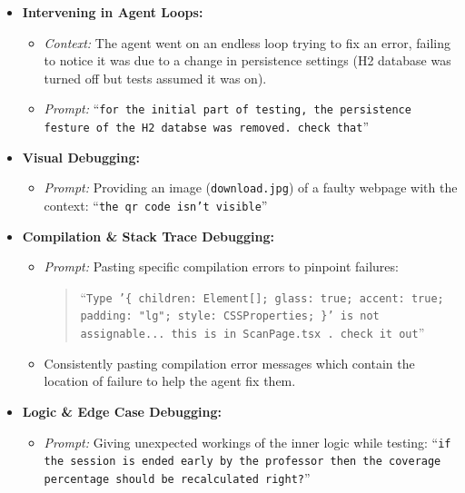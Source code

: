 \documentclass[11pt,a4paper]{article}
\begin{document}
\begin{itemize}[leftmargin=*, itemsep=6pt]
    \item \textbf{Intervening in Agent Loops:}
    \begin{itemize}[itemsep=4pt]
        \item \textit{Context:} The agent went on an endless loop trying to fix an error, failing to notice it was due to a change in persistence settings (H2 database was turned off but tests assumed it was on).
        \item \textit{Prompt:} ``\texttt{for the initial part of testing, the persistence festure of the H2 databse was removed. check that}''
    \end{itemize}

    \item \textbf{Visual Debugging:}
    \begin{itemize}[itemsep=4pt]
        \item \textit{Prompt:} Providing an image (\texttt{download.jpg}) of a faulty webpage with the context: ``\texttt{the qr code isn't visible}''
    \end{itemize}

    \item \textbf{Compilation \& Stack Trace Debugging:}
    \begin{itemize}[itemsep=4pt]
        \item \textit{Prompt:} Pasting specific compilation errors to pinpoint failures:
        \begin{quote}
        ``\texttt{Type '\{ children: Element[]; glass: true; accent: true; padding: "lg"; style: CSSProperties; \}' is not assignable... this is in ScanPage.tsx . check it out}''
        \end{quote}
        \item Consistently pasting compilation error messages which contain the location of failure to help the agent fix them.
    \end{itemize}

    \item \textbf{Logic \& Edge Case Debugging:}
    \begin{itemize}[itemsep=4pt]
        \item \textit{Prompt:} Giving unexpected workings of the inner logic while testing: ``\texttt{if the session is ended early by the professor then the coverage percentage should be recalculated right?}''
    \end{itemize}
\end{itemize}
\end{document}

